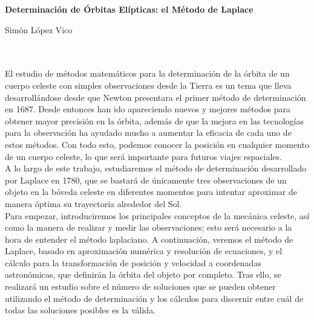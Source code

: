 
\thispagestyle{empty}





\clearpage{\thispagestyle{empty}\cleardoublepage}

\thispagestyle{empty}
\begin{center}
{
	\large\bfseries Determinación de Órbitas Elípticas: el Método de Laplace
}\\
\end{center}

\begin{center}
	Simón López Vico\\
\end{center}

\\

\vspace{0.7cm}
\\

El estudio de métodos matemáticos para la determinación de la órbita de un cuerpo celeste con simples observaciones desde la Tierra es un tema que lleva desarrollándose desde que Newton presentara el primer método de determinación en 1687. Desde entonces han ido apareciendo nuevos y mejores métodos para obtener mayor precisión en la órbita, además de que la mejora en las tecnologías para la observación ha ayudado mucho a aumentar la eficacia de cada uno de estos métodos. Con todo esto, podemos conocer la posición en cualquier momento de un cuerpo celeste, lo que será importante para futuros viajes espaciales.\\

A lo largo de este trabajo, estudiaremos el método de determinación desarrollado por Laplace en 1780, que se bastará de únicamente tres observaciones de un objeto en la bóveda celeste en diferentes momentos para intentar aproximar de manera óptima su trayectoria alrededor del Sol.\\

Para empezar, introduciremos los principales conceptos de la mecánica celeste, así como la manera de realizar y medir las observaciones; esto será necesario a la hora de entender el método laplaciano. A continuación, veremos el método de Laplace, basado en aproximación numérica y resolución de ecuaciones, y el cálculo para la transformación de posición y velocidad a coordenadas astronómicas, que definirán la órbita del objeto por completo. Tras ello, se realizará un estudio sobre el número de soluciones que se pueden obtener utilizando el método de determinación y los cálculos para discernir entre cuál de todas las soluciones posibles es la válida.\\


